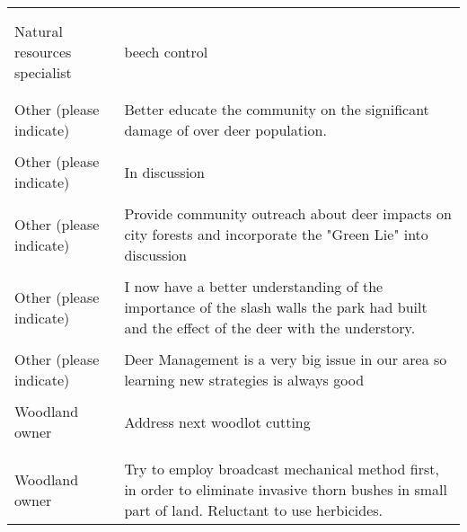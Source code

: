 \documentclass[
]{article}
\begin{document}
\begin{longtable}[t]{l>{\raggedright\arraybackslash}p{10cm}}
\midrule\\
\cellcolor{gray!10}{Natural resources specialist} & \cellcolor{gray!10}{Continue with fern management}\\
\midrule
Natural resources specialist & beech control\\
\midrule\\
\cellcolor{gray!10}{Natural resources specialist} & \cellcolor{gray!10}{Conduct more research.}\\
\midrule
Other (please indicate) & Better educate the community on the significant damage of over deer population.\\
\midrule
\addlinespace
\cellcolor{gray!10}{Other (please indicate)} & \cellcolor{gray!10}{discuss with Wilson Tuscarora Park some ideas. As park was eminent domained in 60s large area was green ash, EAB damage.}\\
\midrule
Other (please indicate) & In \vphantom{2} discussion\\
\midrule
\cellcolor{gray!10}{Other (please indicate)} & \cellcolor{gray!10}{Be more aware of native interfering vegetation when I see forests}\\
\midrule
Other (please indicate) & Provide community outreach about deer impacts on city forests and incorporate the "Green Lie" into discussion\\
\midrule
\cellcolor{gray!10}{Other (please indicate)} & \cellcolor{gray!10}{In \vphantom{1} discussion}\\
\midrule
\addlinespace
Other (please indicate) & I now have a better understanding of the importance of the slash walls the park had built and the effect of the deer with the understory.\\
\midrule
\cellcolor{gray!10}{Other (please indicate)} & \cellcolor{gray!10}{In discussion}\\
\midrule
Other (please indicate) & Deer Management is a very big issue in our area so learning new strategies is always good\\
\midrule
\cellcolor{gray!10}{Woodland owner} & \cellcolor{gray!10}{become more frustrated! Shoot more deer.}\\
\midrule
Woodland owner & Address next woodlot cutting\\
\midrule\\
\addlinespace
\cellcolor{gray!10}{Woodland owner} & \cellcolor{gray!10}{Designate fern heavy area to eradicate via fencing and planting non invasive buses and trees}\\
\midrule
Woodland owner & Try to employ broadcast mechanical method first, in order to eliminate invasive thorn bushes in small part of land.  Reluctant to use herbicides.\\

\end{longtable}
\end{document}
